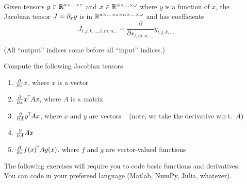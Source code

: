 

\renewcommand{\course}{Maths for Intelligent Systems}
\renewcommand{\coursedate}{Summer 2019}

\renewcommand{\exnum}{Exercise 4}

\exercises


\exercisestitle



Given tensors $y\in{\mathbb{R}}^{a\times\ldots\times z}$ and
$x\in{\mathbb{R}}^{\alpha\times\ldots\times\omega}$ where $y$ is a function of $x$, the
Jacobian tensor $J = \partial_x y$ is in ${\mathbb{R}}^{a\times \ldots\times z\times\alpha\times\ldots\times\omega}$ and has coefficients
$$
  J_{i,j,k,\ldots,l,m,n\ldots} = \frac{\partial}{\partial x_{l,m,n,\ldots}} y_{i,j,k,\ldots}
$$

(All ``output'' indices come before all ``input'' indices.)

Compute the following Jacobian tensors
\begin{enumerate}
  \item $\frac{\partial}{\partial x} x$, where $x$ is a vector
  \item $\frac{\partial}{\partial x} x^{\!\top\!} A x$, where $A$ is a matrix
  \item $\frac{\partial}{\partial A} y^{\!\top\!} A x$, where $x$ and $y$ are vectors ~ (note, we take the derivative w.r.t.\ $A$)
  \item $\frac{\partial}{\partial A} A x$
  \item $\frac{\partial}{\partial x} f(x)^{\!\top\!} A g(x)$, where $f$ and $g$ are vector-valued functions
\end{enumerate}




The following exercises will require you to code basic functions and
derivatives. You can code in your prefereed language (Matlab, NumPy,
Julia, whatever).

